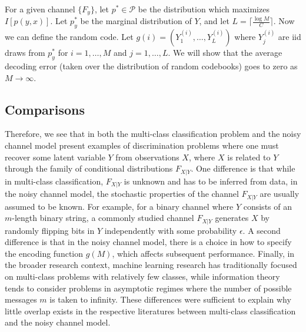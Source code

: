 For a given channel $\{F_y\}$, let $p^* \in \mathcal{P}$ be the
distribution which maximizes $I[p(y, x)]$.  Let $p^*_y$ be the
marginal distribution of $Y$, and let $L = \lceil \frac{\log M}{C}
\rceil$.  Now we can define the random code.  Let $g(i) =
(Y_1^{(i)},\hdots, Y_L^{(i)})$ where $Y_j^{(i)}$ are iid draws from
$p^*_y$ for $i = 1,\hdots, M$ and $j = 1,\hdots, L$.  We will show
that the average decoding error (taken over the distribution of random
codebooks) goes to zero as $M \to \infty$.






\subsection{Comparisons}

Therefore, we see that in both the multi-class classification problem
and the noisy channel model present examples of discrimination
problems where one must recover some latent variable $Y$ from
observations $X$, where $X$ is related to $Y$ through the family of
conditional distributions $F_{X|Y}$.  One difference is that while in
multi-class classification, $F_{X|Y}$ is unknown and has to be
inferred from data, in the noisy channel model, the stochastic
properties of the channel $F_{X|Y}$ are usually assumed to be known.
For example, for a binary channel where $Y$ consists of an $m$-length
binary string, a commonly studied channel $F_{X|Y}$ generates $X$ by
randomly flipping bits in $Y$ independently with some probability
$\epsilon$.  A second difference is that in the noisy channel model,
there is a choice in how to specify the encoding function $g(M)$,
which affects subsequent performance.  Finally, in the broader
research context, machine learning research has traditionally focused
on multi-class problems with relatively few classes, while information
theory tends to consider problems in asymptotic regimes where the
number of possible messages $m$ is taken to infinity. These
differences were sufficient to explain why little overlap exists in
the respective literatures between multi-class classification and the
noisy channel model.  


